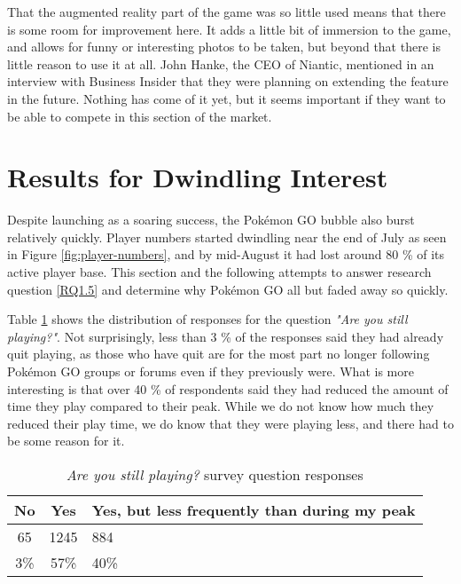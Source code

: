 That the augmented reality part of the game was so little used means that there is some room for improvement here. It adds a little bit of immersion to the game, and allows for funny or interesting photos to be taken, but beyond that there is little reason to use it at all. John Hanke, the CEO of Niantic, mentioned in an interview with Business Insider  that they were planning on extending the feature in the future. Nothing has come of it yet, but it seems important if they want to be able to compete in this section of the market.

\section{Results for Dwindling Interest}
Despite launching as a soaring success, the Pokémon GO bubble also burst relatively quickly. Player numbers started dwindling near the end of July as seen in Figure \ref{fig:player-numbers}, and by mid-August it had lost around 80 \%  of its active player base. This section and the following attempts to answer research question \ref{RQ1.5} and determine why Pokémon GO all but faded away so quickly.


Table \ref{tbl:still-playing} shows the distribution of responses for the question \emph{"Are you still playing?"}. Not surprisingly, less than 3 \% of the responses said they had already quit playing, as those who have quit are for the most part no longer following Pokémon GO groups or forums even if they previously were. What is more interesting is that over 40 \% of respondents said they had reduced the amount of time they play compared to their peak. While we do not know how much they reduced their play time, we do know that they were playing less, and there had to be some reason for it.

\begin{table}[h]
	\centering
	\caption{\emph{Are you still playing?} survey question responses}
	\label{tbl:still-playing}
	\begin{tabular}{|c|c|l|}
		\hline
		\textbf{No} & \textbf{Yes} & \textbf{Yes, but less frequently than during my peak}\\
		\hline\hline
		65 & 1245 & 884\\
		3\% & 57\% & 40\%\\\hline
	\end{tabular}
\end{table}

